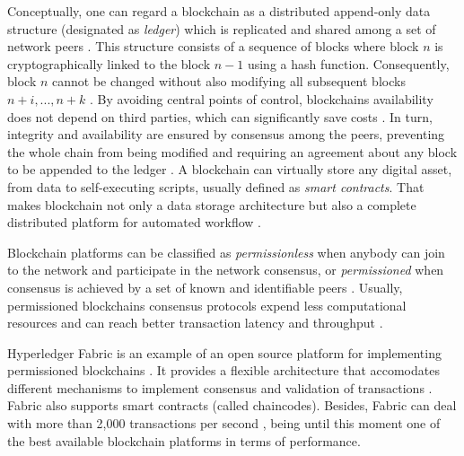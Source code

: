 \documentclass[sigplan]{acmart}
\begin{document}
Conceptually, one can regard a blockchain as a distributed append-only data structure (designated as \emph{ledger}) which is replicated and shared among a set of network peers \cite{Christidis2016}. 
This structure consists of a sequence of blocks where block $n$ is cryptographically linked to the block $n-1$ using a hash function. 
Consequently, block $n$ cannot be changed without also modifying all subsequent blocks $n + i, ..., n + k$ \cite{Sousa2018}. 
By avoiding central points of control, blockchains availability does not depend on third parties, which can significantly save costs \cite{Zheng2017}.
In turn, integrity and availability are ensured by consensus among the peers, preventing the whole chain from being modified and requiring an agreement about any block to be appended to the ledger \cite{Sousa2018,Vukolic2016}. 
A blockchain can virtually store any digital asset, from data to self-executing scripts, usually defined as \emph{smart contracts}. 
That makes blockchain not only a data storage architecture but also a complete distributed platform for automated workflow \cite{Christidis2016}. 

Blockchain platforms can be classified as \emph{permissionless} when anybody can join to the network and participate in the network consensus, or \emph{permissioned} when consensus is achieved by a set of known and identifiable peers \cite{Vukolic2016,Androulaki2018}. 
Usually, permissioned blockchains consensus protocols expend less computational resources and can reach better transaction latency and throughput \cite{Sousa2018}.

Hyperledger Fabric is an example of an open source platform for implementing permissioned blockchains \cite{Androulaki2018}.
It provides a flexible architecture that accomodates different mechanisms to implement consensus and validation of transactions \cite{Sousa2018}.
Fabric also supports smart contracts (called chaincodes).
Besides, Fabric can deal with more than 2,000 transactions per second \cite{Androulaki2018}, being until this moment one of the best available blockchain platforms in terms of performance.
\end{document}
